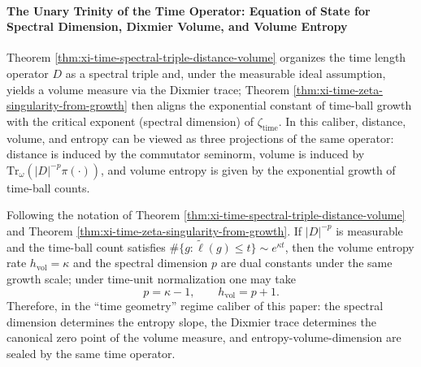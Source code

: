 
\paragraph{The Unary Trinity of the Time Operator: Equation of State for Spectral Dimension, Dixmier Volume, and Volume Entropy}
Theorem \ref{thm:xi-time-spectral-triple-distance-volume} organizes the time length operator \(D\) as a spectral triple and, under the measurable ideal assumption, yields a volume measure via the Dixmier trace;
Theorem \ref{thm:xi-time-zeta-singularity-from-growth} then aligns the exponential constant of time-ball growth with the critical exponent (spectral dimension) of \(\zeta_{\mathrm{time}}\).
In this caliber, distance, volume, and entropy can be viewed as three projections of the same operator: distance is induced by the commutator seminorm, volume is induced by \(\mathrm{Tr}_\omega(|D|^{-p}\pi(\cdot))\), and volume entropy is given by the exponential growth of time-ball counts.

\begin{corollary}[Equation of state for volume entropy and spectral dimension: \texorpdfstring{$h_{\mathrm{vol}}=p+1$}{h_vol=p+1}]\label{cor:xi-time-volume-entropy-state-equation}
Following the notation of Theorem \ref{thm:xi-time-spectral-triple-distance-volume} and Theorem \ref{thm:xi-time-zeta-singularity-from-growth}.
If \(|D|^{-p}\) is measurable and the time-ball count satisfies
\(
\#\{g:\widetilde\ell(g)\le t\}\sim e^{\kappa t}
\),
then the volume entropy rate \(h_{\mathrm{vol}}=\kappa\) and the spectral dimension \(p\) are dual constants under the same growth scale; under time-unit normalization one may take
\[
\boxed{\;p=\kappa-1,\qquad h_{\mathrm{vol}}=p+1.\;}
\]
Therefore, in the ``time geometry'' regime caliber of this paper: the spectral dimension determines the entropy slope, the Dixmier trace determines the canonical zero point of the volume measure, and entropy-volume-dimension are sealed by the same time operator.
\end{corollary}

